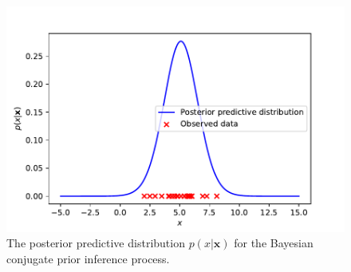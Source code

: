 \documentclass{article}
\begin{document}
\begin{figure}[htb!]
\centering
\includegraphics[scale=0.7]{Q1b_14.pdf}
\caption{The posterior predictive distribution $p(x \vert \mathbf{x})$ for the Bayesian conjugate prior inference process.}
\label{fig:Q1b_post_predict}
\end{figure}
\end{document}
